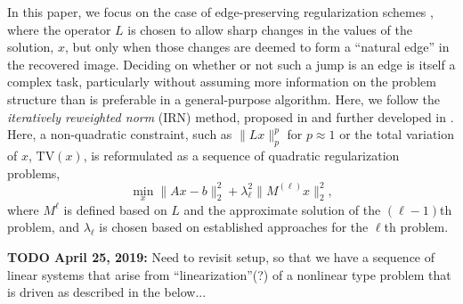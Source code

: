In this paper, we focus on the case of edge-preserving regularization
schemes \cite{CRVogel_2002a, Gazzola_etal_2020}, where the operator $L$ is chosen to allow sharp
changes in the values of the solution, $x$, but only when those
changes are deemed to form a ``natural edge'' in the recovered image.
Deciding on whether or not such a jump is an edge is itself a complex
task, particularly without assuming more information on the problem
structure than is preferable in a general-purpose algorithm.  Here, we
follow the \textit{iteratively reweighted norm} (IRN) method, proposed
in \cite{Gorodnitsky_Rao_1992} and further developed in
\cite{Rodriguez_Wohlberg, RARenaut_etal_2017}. Here, a non-quadratic
constraint, such as $\|Lx\|_p^p$ for $p\approx 1$ or the total
variation of $x$, $\mathrm{TV}(x)$, is reformulated as a sequence of
quadratic regularization problems,
\begin{equation}
\label{eq:sequence}
\min_{x} \| A x - b \|_2^2 + \lambda_\ell^2 \| M^{(\ell)} x \|_2^2,
\end{equation}
where $M^{\ell}$ is defined based on $L$ and the approximate solution
of the $(\ell-1)$th problem, and $\lambda_\ell$ is chosen based on
established approaches for the $\ell$th problem.


{\bf TODO April 25, 2019:} Need to revisit setup, so that we have a
sequence of linear systems that arise from ``linearization''(?) of a
nonlinear type problem that is driven as described in the below...
